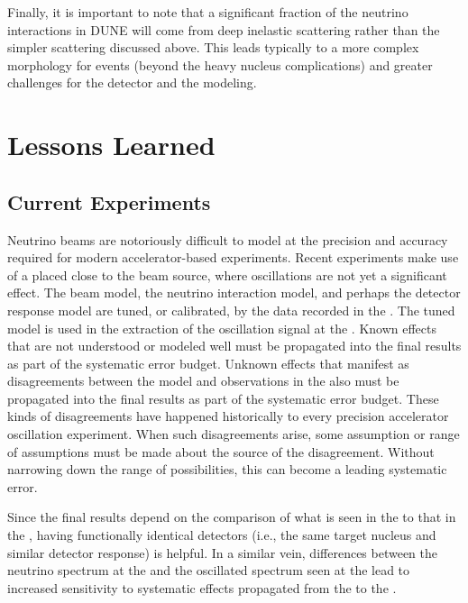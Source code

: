 Finally, it is important to note that a significant fraction of the neutrino interactions in DUNE will come from deep inelastic scattering rather than the 
simpler  scattering discussed above.  This leads typically to a more complex morphology for events (beyond the heavy nucleus complications) and greater challenges for the detector and the modeling.  

\section{Lessons Learned} 
\label{sec:appx-nd:overview-lessons}

\subsection{Current Experiments}
Neutrino beams are notoriously difficult to model at the precision and accuracy required for modern accelerator-based experiments.  Recent  experiments make use of a   placed close to the beam source, where oscillations are not yet a significant effect.  The beam model, the neutrino interaction model, and perhaps the detector response model are tuned, or calibrated, by the data recorded in the  . The tuned model is used in the extraction of the oscillation signal at the  . Known effects that are not understood or modeled well must be propagated into the final results as part of the systematic error budget.  Unknown effects that manifest as disagreements between the model and observations in the   also must be propagated into the final results as part of the systematic error budget.  These kinds of disagreements have happened historically to every precision accelerator oscillation experiment.  When such disagreements arise, some assumption or range of assumptions must be made about the source of the disagreement.  Without narrowing down the range of possibilities, this can become a leading systematic error.



Since the final results depend on the comparison of what is seen in the   to that in the  , having functionally identical detectors (i.e., the same target nucleus and similar detector response) is helpful.  In a similar vein, differences between the neutrino spectrum at the   and the oscillated spectrum seen at the   lead to increased sensitivity to systematic effects propagated from the   to the  .

